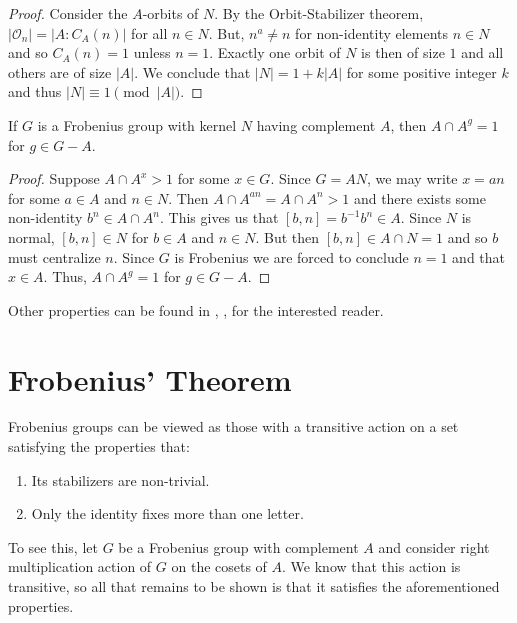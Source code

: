 \documentclass[main.tex]{subfiles}
\begin{document}
\begin{proof}
Consider the $A$-orbits of $N$. By the Orbit-Stabilizer theorem, $|\mathcal{O}_n| = |A : C_A(n)|$ for all $n \in N$. But, $n^a \ne n$ for non-identity elements $n \in N$ and so $C_A(n) = 1$ unless $n = 1$. Exactly one orbit of $N$ is then of size $1$ and all others are of size $|A|$. We conclude that $|N| = 1 + k |A|$ for some positive integer $k$ and thus $|N| \equiv 1 \pmod{|A|}$.
\end{proof}

\begin{lemma}\label{frobeniusdisjoint}
If $G$ is a Frobenius group with kernel $N$ having complement $A$, then $A \cap A^g = 1$ for $g \in G - A$.
\end{lemma}

\begin{proof}
Suppose $A \cap A^x > 1$ for some $x \in G$. Since $G = AN$, we may write $x = an$ for some $a \in A$ and $n \in N$. Then $A \cap A^{an} = A \cap A^n > 1$ and there exists some non-identity $b^n \in A \cap A^n$. This gives us that $[b,n] = b^{-1}b^n \in A$. Since $N$ is normal, $[b, n] \in N$ for $b \in A$ and $n \in N$. But then $[b,n] \in A \cap N = 1$ and so $b$ must centralize $n$. Since $G$ is Frobenius we are forced to conclude $n = 1$ and that $x \in A$. Thus, $A \cap A^g = 1$ for $g \in G - A$.
\end{proof}

Other properties can be found in \cite{isaacsfinitegrouptheory}, \cite{gorensteinfinitegroups}, \cite{isaacsalgebra} for the interested reader.

\hss

\section{Frobenius' Theorem}

\hss

Frobenius groups can be viewed as those with a transitive action on a set satisfying the properties that:
\begin{enumerate}
	\item Its stabilizers are non-trivial.
	\item Only the identity fixes more than one letter.
\end{enumerate}
To see this, let $G$ be a Frobenius group with complement $A$ and consider right multiplication action of $G$ on the cosets of $A$. We know that this action is transitive, so all that remains to be shown is that it satisfies the aforementioned properties.
\end{document}
